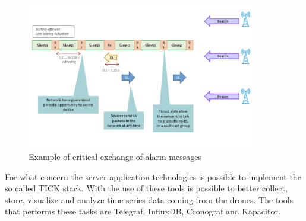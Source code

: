 \documentclass[12pt]{report}
\begin{document}
\begin{figure}[h!]
    \centering
    \includegraphics[width=10cm]{Pictures/Class B devices.png}
    \caption{Example of critical exchange of alarm messages}
\end{figure}


For what concern the server application technologies is possible to implement the so called TICK stack. With the use of these tools is possible to better collect, store, visualize and analyze time series data coming from the drones. The tools that performs these tasks are Telegraf, InfluxDB, Cronograf and Kapacitor.
\end{document}
